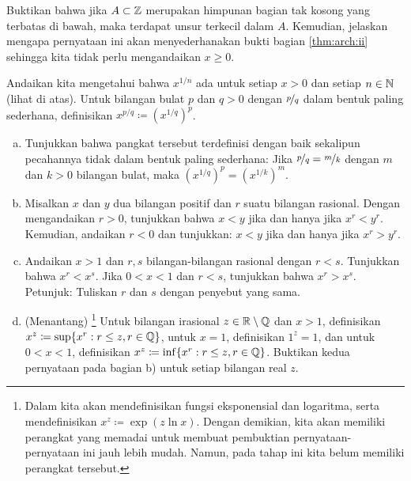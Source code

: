 \begin{exercise}
Buktikan bahwa jika $A \subset {\mathbb{Z}}$ merupakan himpunan bagian tak kosong yang terbatas di bawah, maka
terdapat unsur terkecil dalam $A$.
Kemudian, jelaskan mengapa pernyataan ini akan menyederhanakan bukti
 bagian \ref{thm:arch:ii} sehingga kita tidak perlu mengandaikan
$x \geq 0$.
\end{exercise}

\begin{samepage}
\begin{exercise} \label{exercise:realpower}
Andaikan kita mengetahui bahwa $x^{1/n}$ ada untuk setiap $x > 0$ dan setiap $n \in
{\mathbb{N}}$ (lihat  di atas).
Untuk bilangan bulat $p$ dan $q > 0$ dengan $\nicefrac{p}{q}$ dalam bentuk paling sederhana,
definisikan $x^{p/q} \coloneqq
{(x^{1/q})}^p$.
\begin{enumerate}[a)]
\item
Tunjukkan bahwa pangkat tersebut terdefinisi dengan baik sekalipun
pecahannya tidak dalam bentuk paling sederhana: Jika $\nicefrac{p}{q} =
\nicefrac{m}{k}$ dengan $m$ dan $k > 0$ bilangan bulat, maka
${(x^{1/q})}^p = {(x^{1/k})}^m$.
\item
Misalkan $x$ dan $y$ dua bilangan positif dan $r$ suatu bilangan rasional.
Dengan mengandaikan $r > 0$, tunjukkan bahwa
$x < y$ jika dan hanya jika $x^r < y^r$.  Kemudian, andaikan $r < 0$ dan tunjukkan:
$x < y$ jika dan hanya jika $x^r > y^r$.
\item
Andaikan $x > 1$ dan $r,s$ bilangan-bilangan rasional dengan $r < s$.
Tunjukkan bahwa $x^r < x^s$.  Jika $0 < x < 1$ dan $r < s$, tunjukkan bahwa $x^r > x^s$.
Petunjuk: Tuliskan $r$ dan $s$ dengan penyebut yang sama.
\item
(Menantang)%
\footnote{Dalam
kita akan mendefinisikan fungsi eksponensial dan logaritma, serta
mendefinisikan $x^z \coloneqq \exp(z \ln x)$.  Dengan demikian, kita akan memiliki
perangkat yang memadai untuk membuat pembuktian pernyataan-pernyataan ini jauh lebih mudah.  Namun, pada
tahap ini kita belum memiliki perangkat tersebut.}
Untuk bilangan irasional $z \in {\mathbb{R}} \setminus {\mathbb{Q}}$ dan $x > 1$, definisikan
$x^z \coloneqq \sup \{ x^r : r \leq z, r \in {\mathbb{Q}} \}$,
untuk $x=1$, definisikan $1^z = 1$,
dan untuk $0 < x < 1$, definisikan
$x^z \coloneqq \inf \{ x^r : r \leq z, r \in {\mathbb{Q}} \}$.
Buktikan kedua pernyataan pada bagian b) untuk setiap bilangan real $z$.
\end{enumerate}
\end{exercise}
\end{samepage}



